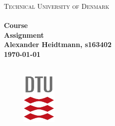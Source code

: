 \begin{titlepage}

\begin{center}
\textsc{\LARGE Technical University of Denmark}\\[1.5cm]

\HRule \\
\Large \bfseries Course \\
\large \bfseries Assignment \\[1cm]
Alexander Heidtmann, s163402 \\
\today \\
\HRule \\[1cm]

\vspace{0.5cm}

\hspace{1cm}
\begin{center}
\end{center}
\hspace{3cm}

\vfill

\noindent
\begin{figure}[h!]
\centering
\includegraphics[width=0.15\textwidth]{setup/DTU.PNG}
\end{figure}
\end{center}
\end{titlepage}

